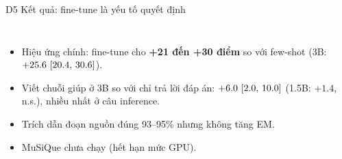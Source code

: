 \documentclass[aspectratio=169,t]{beamer}
\newcommand{\ci}[2]{{\tiny[#1,\,#2]}}
\begin{document}
\begin{frame}[shrink]{D5 \textperiodcentered{} Kết quả: fine-tune là yếu tố quyết định}
\begin{columns}[T,onlytextwidth]
\begin{itemize}
  \item Hiệu ứng chính: fine-tune cho \textbf{+21 đến +30 điểm} so với few-shot (3B: $+25.6\ \ci{20.4}{30.6}$).
  \item Viết chuỗi giúp ở 3B so với chỉ trả lời đáp án: $+6.0\ \ci{2.0}{10.0}$ (1.5B: $+1.4$, n.s.), nhiều nhất ở câu inference.
  \item Trích dẫn đoạn nguồn đúng 93--95\% nhưng không tăng EM.
  \item MuSiQue chưa chạy (hết hạn mức GPU).
\end{itemize}
\end{columns}
\par\kern0pt
\end{frame}
\end{document}
